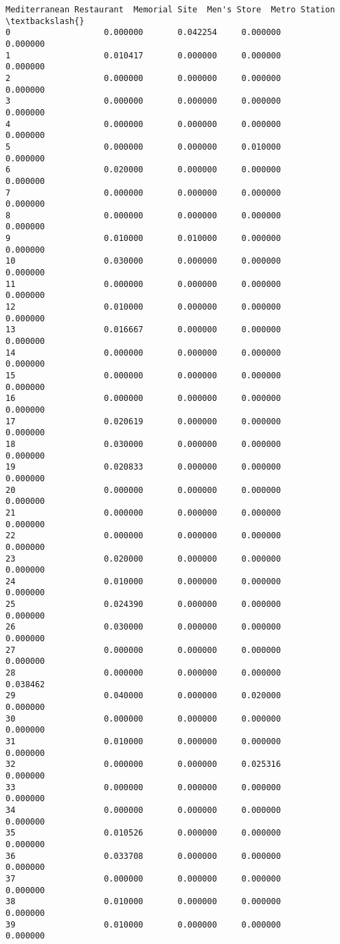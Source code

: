 \documentclass[11pt]{article}
\begin{document}
\begin{tcolorbox}[breakable, size=fbox, boxrule=.5pt, pad at break*=1mm, opacityfill=0]
\begin{Verbatim}[commandchars=\\\{\}]
    Mediterranean Restaurant  Memorial Site  Men's Store  Metro Station  \textbackslash{}
0                   0.000000       0.042254     0.000000       0.000000
1                   0.010417       0.000000     0.000000       0.000000
2                   0.000000       0.000000     0.000000       0.000000
3                   0.000000       0.000000     0.000000       0.000000
4                   0.000000       0.000000     0.000000       0.000000
5                   0.000000       0.000000     0.010000       0.000000
6                   0.020000       0.000000     0.000000       0.000000
7                   0.000000       0.000000     0.000000       0.000000
8                   0.000000       0.000000     0.000000       0.000000
9                   0.010000       0.010000     0.000000       0.000000
10                  0.030000       0.000000     0.000000       0.000000
11                  0.000000       0.000000     0.000000       0.000000
12                  0.010000       0.000000     0.000000       0.000000
13                  0.016667       0.000000     0.000000       0.000000
14                  0.000000       0.000000     0.000000       0.000000
15                  0.000000       0.000000     0.000000       0.000000
16                  0.000000       0.000000     0.000000       0.000000
17                  0.020619       0.000000     0.000000       0.000000
18                  0.030000       0.000000     0.000000       0.000000
19                  0.020833       0.000000     0.000000       0.000000
20                  0.000000       0.000000     0.000000       0.000000
21                  0.000000       0.000000     0.000000       0.000000
22                  0.000000       0.000000     0.000000       0.000000
23                  0.020000       0.000000     0.000000       0.000000
24                  0.010000       0.000000     0.000000       0.000000
25                  0.024390       0.000000     0.000000       0.000000
26                  0.030000       0.000000     0.000000       0.000000
27                  0.000000       0.000000     0.000000       0.000000
28                  0.000000       0.000000     0.000000       0.038462
29                  0.040000       0.000000     0.020000       0.000000
30                  0.000000       0.000000     0.000000       0.000000
31                  0.010000       0.000000     0.000000       0.000000
32                  0.000000       0.000000     0.025316       0.000000
33                  0.000000       0.000000     0.000000       0.000000
34                  0.000000       0.000000     0.000000       0.000000
35                  0.010526       0.000000     0.000000       0.000000
36                  0.033708       0.000000     0.000000       0.000000
37                  0.000000       0.000000     0.000000       0.000000
38                  0.010000       0.000000     0.000000       0.000000
39                  0.010000       0.000000     0.000000       0.000000


\end{Verbatim}
\end{tcolorbox}
\end{document}
